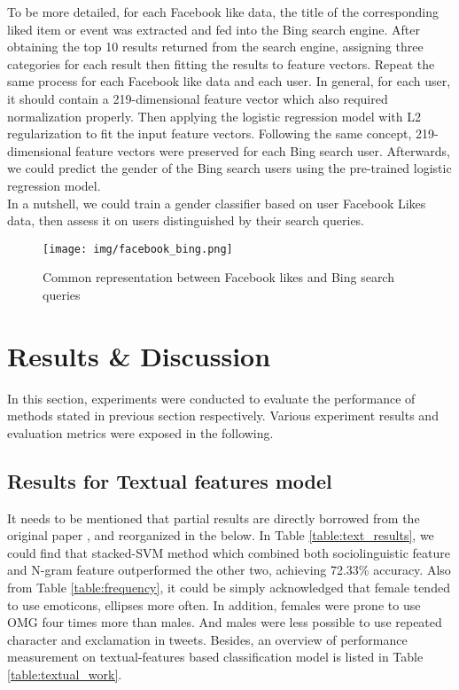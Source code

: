 \documentclass[runningheads]{llncs}
\begin{document}
	To be more detailed, for each Facebook like data, the title of the corresponding liked item or event was extracted and fed into the Bing search engine. After obtaining the top 10 results returned from the search engine, assigning three categories for each result then fitting the results to feature vectors. Repeat the same process for each Facebook like data and each user. In general, for each user, it should contain a 219-dimensional feature vector which also required normalization properly. Then applying the logistic regression model with L2 regularization to fit the input feature vectors. Following the same concept, 219-dimensional feature vectors were preserved for each Bing search user. Afterwards, we could predict the gender of the Bing search users using the pre-trained logistic regression model. \\
	
	In a nutshell, we could train a gender classifier based on user Facebook Likes data, then assess it on users distinguished by their search queries.  \\
	
	\begin{figure}
		\centering
		\texttt{[image: img/facebook\_bing.png]}
		\caption{Common representation between Facebook likes and Bing search queries}
		\label{fig:facebook_bing}
	\end{figure}
	
	\section{Results \& Discussion}
	In this section, experiments were conducted to evaluate the performance of methods stated in previous section respectively. Various experiment results and evaluation metrics were exposed in the following.
	
	\subsection{Results for Textual features model}
	
	It needs to be mentioned that partial results are directly borrowed from the original paper \cite{rao2010classifying}, and reorganized in the below. In Table \ref{table:text_results}, we could find that stacked-SVM method which combined both sociolinguistic feature and N-gram feature outperformed the other two, achieving 72.33\% accuracy. Also from Table  \ref{table:frequency}, it could be simply acknowledged that female tended to use emoticons, ellipses more often. In addition, females were prone to use OMG four times more than males. And males were less possible to use repeated character and exclamation in tweets. Besides, an overview of performance measurement on textual-features based classification model is listed in Table \ref{table:textual_work}.  
	
\end{document}
